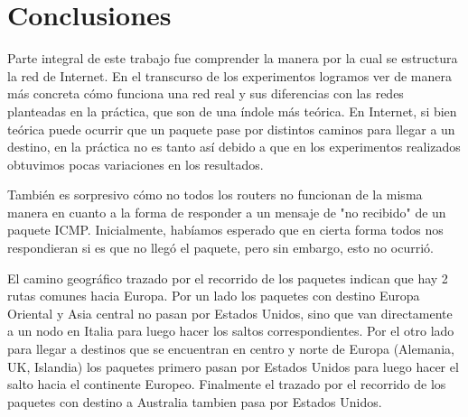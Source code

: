\section{Conclusiones}
\PARstart Parte integral de este trabajo fue comprender la manera por la cual se estructura la red de Internet. 
En el transcurso de los experimentos logramos ver de manera más concreta cómo funciona una red real y sus diferencias
con las redes planteadas en la práctica, que son de una índole más teórica. 
En Internet, si bien teórica puede ocurrir que un paquete pase por distintos caminos para llegar a un destino, 
en la práctica no es tanto así debido a que en los experimentos realizados obtuvimos pocas variaciones en los resultados.

También es sorpresivo cómo no todos los routers no funcionan de la misma manera en cuanto a la forma de responder
a un mensaje de "no recibido" de un paquete ICMP. Inicialmente, habíamos esperado que en cierta forma todos nos respondieran
si es que no llegó el paquete, pero sin embargo, esto no ocurrió.

El camino geográfico trazado por el recorrido de los paquetes indican que hay 2 rutas comunes hacia Europa. Por un lado los paquetes 
con destino Europa Oriental y Asia central no pasan por Estados Unidos, sino que van directamente a un nodo en Italia 
para luego hacer los saltos correspondientes. Por el otro lado para llegar a destinos que se encuentran en centro y norte de Europa
(Alemania, UK, Islandia) los paquetes primero pasan por Estados Unidos para luego hacer el salto hacia el continente Europeo.
Finalmente el trazado por el recorrido de los paquetes con destino a Australia tambien pasa por Estados Unidos.
